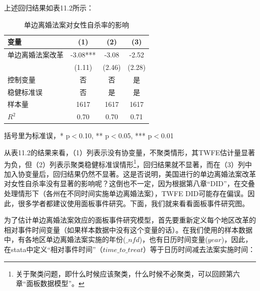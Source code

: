 \documentclass[cn,12pt,math=newtx,citestyle=gb7714-2015,bibstyle=gb7714-2015]{elegantbook}
\begin{document}
      上述回归结果如表11.2所示：
      
      	\begin{table}[htbp]\centering
      	\scriptsize
      	\caption{单边离婚法案对女性自杀率的影响}
      	\label{eventstudy}
      	\begin{center}
      		\begin{threeparttable}
      			\begin{tabular}{lccc}
      				\toprule
      				\textbf{变量}&\textbf{(1)}&\textbf{(2)}&\textbf{(3)}\\
      				\midrule
      				单边离婚法案改革               &      -3.08***&-3.08&   -2.52   \\
      				&    (1.11)   &(2.46)   &     (2.28)         \\
      			     控制变量 &   否 &    否 &是  \\
      				 稳健标准误&    否    &是     &是        \\
      				样本量   & 1617 &1617&1617 \\
      				$R^2$    &0.70&0.70&0.71
      				\\
      				\bottomrule
      			\end{tabular}
      			\begin{tablenotes}
      				\tiny
      				\item 括号里为标准误，* p$<$0.10, ** p$<$0.05, *** p$<$0.01
      			\end{tablenotes}
      		\end{threeparttable}
      	\end{center}
      \end{table}
      
	    从表11.2的结果来看，（1）列表示没有协变量，不聚类情形，其TWFE估计量显著为负，但（2）列表示聚类稳健标准误情形\footnote{关于聚类问题，即什么时候应该聚类，什么时候不必聚类，可以回顾第六章“面板数据模型”。}，回归结果就不显著，而在（3）列中加入协变量后，回归结果仍然不显著。这是否说明，美国进行的单边离婚法案改革对女性自杀率没有显著的影响呢？这倒也不一定，因为根据第八章“DID”，在交叠处理情形下（各州在不同时间实施单边离婚法案），TWFE DID可能存在偏误。因此，很多学者都建议使用面板事件研究。下面，我们就来看看面板事件研究图。
	    
	    为了估计单边离婚法案效应的面板事件研究模型，首先要重新定义每个地区改革的相对事件时间变量（如果样本数据中没有这个变量的话）。在我们使用的样本数据中，有各地区单边离婚法案实施的年份($\_nfd$)，也有日历时间变量($year$)，因此，在stata中定义“相对事件时间”（$time\_to\_treat$）等于日历时间减去法案实施时间：
	    
\end{document}
